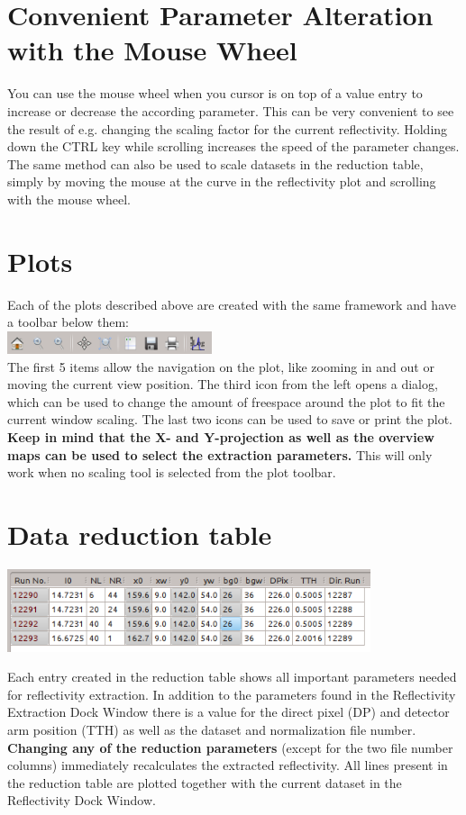 \section{Convenient Parameter Alteration with the Mouse Wheel}
  You can use the mouse wheel when you cursor is on top of a value entry to increase or decrease the according parameter. 
  This can be very convenient to see the result of e.g. changing the scaling factor for the current reflectivity. Holding down the CTRL key while scrolling increases the speed of the parameter changes.
  The same method can also be used to scale datasets in the reduction table, simply by moving the mouse at the curve in the reflectivity plot and scrolling with the mouse wheel.
  
\section{Plots}
  Each of the plots described above are created with the same framework and have a toolbar below them:\\
  \includegraphics[width=6cm]{screenshots/plottoolbar.png}\\
  The first 5 items allow the navigation on the plot, like zooming in and out or moving the current view position.
  The third icon from the left opens a dialog, which can be used to change the amount of freespace around the plot to fit the current window scaling.
  The last two icons can be used to save or print the plot.
  \textbf{Keep in mind that the X- and Y-projection as well as the overview maps can be used to select the extraction parameters.}
  This will only work when no scaling tool is selected from the plot toolbar.

\section{Data reduction table}
  \includegraphics[width=0.8\textwidth]{screenshots/reductiontable.png}

  Each entry created in the reduction table shows all important parameters needed for reflectivity extraction.
  In addition to the parameters found in the Reflectivity Extraction Dock Window there is a value for the direct pixel (DP) and detector arm position (TTH) as well as the dataset and normalization file number.
  \textbf{Changing any of the reduction parameters} (except for the two file number columns) immediately recalculates the extracted reflectivity.
  All lines present in the reduction table are plotted together with the current dataset in the Reflectivity Dock Window.

